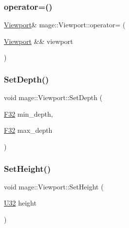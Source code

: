 \hypertarget{classmage_1_1_viewport_a83ef22f5db0991bc540372d37905524d}{}\label{classmage_1_1_viewport_a83ef22f5db0991bc540372d37905524d} 
\subsubsection{\texorpdfstring{operator=()}{operator=()}\hspace{0.1cm}{\footnotesize\ttfamily [2/2]}}
{\footnotesize\ttfamily \hyperlink{classmage_1_1_viewport}{Viewport}\& mage\+::\+Viewport\+::operator= (\begin{DoxyParamCaption}\item[{\hyperlink{classmage_1_1_viewport}{Viewport} \&\&}]{viewport }\end{DoxyParamCaption})\hspace{0.3cm}{\ttfamily [default]}}

\hypertarget{classmage_1_1_viewport_a15a328f7feb3f17dc1c9af47f30dce3b}{}\label{classmage_1_1_viewport_a15a328f7feb3f17dc1c9af47f30dce3b} 
\subsubsection{\texorpdfstring{Set\+Depth()}{SetDepth()}}
{\footnotesize\ttfamily void mage\+::\+Viewport\+::\+Set\+Depth (\begin{DoxyParamCaption}\item[{\hyperlink{namespacemage_aa97e833b45f06d60a0a9c4fc22ae02c0}{F32}}]{min\+\_\+depth,  }\item[{\hyperlink{namespacemage_aa97e833b45f06d60a0a9c4fc22ae02c0}{F32}}]{max\+\_\+depth }\end{DoxyParamCaption})\hspace{0.3cm}{\ttfamily [noexcept]}}

\hypertarget{classmage_1_1_viewport_abe55d91495584c60ff1bc91a7f286329}{}\label{classmage_1_1_viewport_abe55d91495584c60ff1bc91a7f286329} 
\subsubsection{\texorpdfstring{Set\+Height()}{SetHeight()}\hspace{0.1cm}{\footnotesize\ttfamily [1/2]}}
{\footnotesize\ttfamily void mage\+::\+Viewport\+::\+Set\+Height (\begin{DoxyParamCaption}\item[{\hyperlink{namespacemage_a41c104c036fba3756a74e19f793eeaa1}{U32}}]{height }\end{DoxyParamCaption})\hspace{0.3cm}{\ttfamily [noexcept]}}

